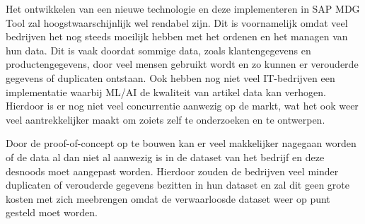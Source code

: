 Het ontwikkelen van een nieuwe technologie en deze implementeren in SAP MDG Tool zal hoogstwaarschijnlijk wel rendabel zijn. Dit is voornamelijk omdat veel bedrijven het nog steeds moeilijk hebben met het ordenen en het managen van hun data. Dit is vaak doordat sommige data, zoals klantengegevens en productengegevens, door veel mensen gebruikt wordt en zo kunnen er verouderde gegevens of duplicaten ontstaan. Ook hebben nog niet veel IT-bedrijven een implementatie waarbij ML/AI de kwaliteit van artikel data kan verhogen. Hierdoor is er nog niet veel concurrentie aanwezig op de markt, wat het ook weer veel aantrekkelijker maakt om zoiets zelf te onderzoeken en te ontwerpen. 

Door de proof-of-concept op te bouwen kan er veel makkelijker nagegaan worden of de data al dan niet al aanwezig is in de dataset van het bedrijf en deze desnoods moet aangepast worden. Hierdoor zouden de bedrijven veel minder duplicaten of verouderde gegevens bezitten in hun dataset en zal dit geen grote kosten met zich meebrengen omdat de verwaarloosde dataset weer op punt gesteld moet worden.

